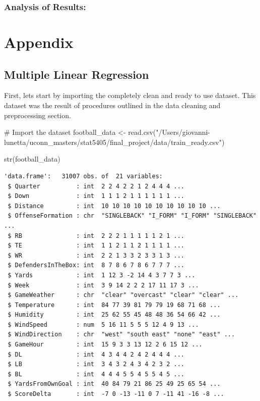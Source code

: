 \documentclass[
  super,
  preprint,
  3p]{elsarticle}
\newenvironment{Shaded}{\begin{snugshade}}{\end{snugshade}}
\newcommand{\CommentTok}[1]{\textcolor[rgb]{0.37,0.37,0.37}{#1}}
\newcommand{\FunctionTok}[1]{\textcolor[rgb]{0.28,0.35,0.67}{#1}}
\newcommand{\NormalTok}[1]{\textcolor[rgb]{0.00,0.23,0.31}{#1}}
\newcommand{\OtherTok}[1]{\textcolor[rgb]{0.00,0.23,0.31}{#1}}
\newcommand{\StringTok}[1]{\textcolor[rgb]{0.13,0.47,0.30}{#1}}
\begin{document}
\hypertarget{analysis-of-results}{%
\subsubsection{Analysis of Results:}\label{analysis-of-results}}

\hypertarget{appendix}{%
\section{Appendix}\label{appendix}}

\hypertarget{multiple-linear-regression}{%
\subsection{Multiple Linear
Regression}\label{multiple-linear-regression}}

First, lets start by importing the completely clean and ready to use
dataset. This dataset was the result of procedures outlined in the data
cleaning and preprocessing section.

\begin{Shaded}
\begin{Highlighting}[]
\CommentTok{\# Import the dataset}
\NormalTok{football\_data }\OtherTok{\textless{}{-}} \FunctionTok{read.csv}\NormalTok{(}\StringTok{"/Users/giovanni{-}lunetta/uconn\_masters/stat5405/final\_project/data/train\_ready.csv"}\NormalTok{)}

\FunctionTok{str}\NormalTok{(football\_data)}
\end{Highlighting}
\end{Shaded}

\begin{verbatim}
'data.frame':   31007 obs. of  21 variables:
 $ Quarter          : int  2 2 4 2 2 1 2 4 4 4 ...
 $ Down             : int  1 1 1 2 1 1 1 1 1 1 ...
 $ Distance         : int  10 10 10 10 10 10 10 10 10 10 ...
 $ OffenseFormation : chr  "SINGLEBACK" "I_FORM" "I_FORM" "SINGLEBACK" ...
 $ RB               : int  2 2 2 1 1 1 1 1 2 1 ...
 $ TE               : int  1 1 2 1 1 2 1 1 1 1 ...
 $ WR               : int  2 2 1 3 3 2 3 3 1 3 ...
 $ DefendersInTheBox: int  8 7 8 6 7 8 6 7 7 7 ...
 $ Yards            : int  1 12 3 -2 14 4 3 7 7 3 ...
 $ Week             : int  3 9 14 2 2 2 17 11 17 3 ...
 $ GameWeather      : chr  "clear" "overcast" "clear" "clear" ...
 $ Temperature      : int  84 77 39 81 79 79 19 68 71 68 ...
 $ Humidity         : int  25 62 55 45 48 48 36 54 66 42 ...
 $ WindSpeed        : num  5 16 11 5 5 5 12 4 9 13 ...
 $ WindDirection    : chr  "west" "south east" "none" "east" ...
 $ GameHour         : int  15 9 3 3 13 12 2 6 15 12 ...
 $ DL               : int  4 3 4 4 2 4 2 4 4 4 ...
 $ LB               : int  3 4 3 2 4 3 4 2 3 2 ...
 $ BL               : int  4 4 4 5 5 4 5 5 4 5 ...
 $ YardsFromOwnGoal : int  40 84 79 21 86 25 49 25 65 54 ...
 $ ScoreDelta       : int  -7 0 -13 -11 0 7 -11 41 -16 -8 ...
\end{verbatim}
\end{document}
